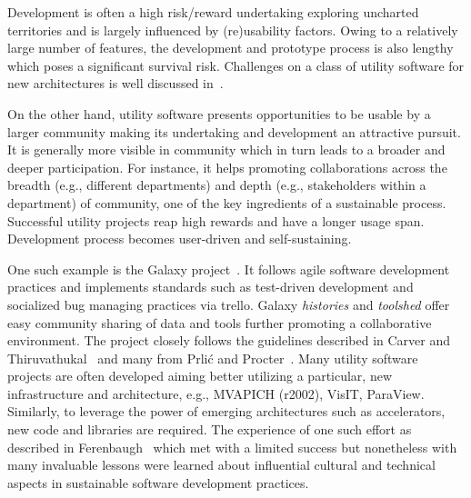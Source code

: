 \documentclass[11pt, oneside]{amsart}
\newcommand{\toolname}[1] {\textsf{#1}}
\begin{document}
Development is often a high risk/reward undertaking exploring
uncharted territories and is largely influenced by (re)usability
factors. Owing to a relatively large number of features, the development
and prototype process is also lengthy which poses a significant
survival risk. Challenges on a class of utility software for new
architectures is well discussed in~\cite{Ferenbaugh_WSSSPE}.

On the other hand, utility software presents opportunities to be usable by a
larger community making its undertaking and development an attractive pursuit.
It is generally more visible in community which in turn leads to a broader and
deeper participation. For instance, it helps promoting collaborations across
the breadth (e.g., different departments) and depth (e.g., stakeholders within
a department) of community, one of the key ingredients of a sustainable
process. Successful utility projects reap high rewards and have a longer usage
span. Development process becomes user-driven and self-sustaining.

One such example is the \toolname{Galaxy} project~\cite{Galaxy}. It follows
agile software development practices and implements standards such as
test-driven development and socialized bug managing practices via
\toolname{trello}. \toolname{Galaxy} \emph{histories} and \emph{toolshed} offer
easy community sharing of data and tools further promoting a collaborative
environment. The project closely follows the guidelines described in Carver and
Thiruvathukal~\cite{Carver_WSSSPE} and many from Prli\'{c} and
Procter~\cite{Prlic_WSSSPE}. Many utility software projects are often developed
aiming better utilizing a particular, new infrastructure and architecture,
e.g., \toolname{MVAPICH (r2002)}, \toolname{VisIT}, \toolname{ParaView}. Similarly, to
leverage the power of emerging architectures such as accelerators, new code and
libraries are required. The experience of one such effort as described in
Ferenbaugh~\cite{Ferenbaugh_WSSSPE} which met with a limited success but
nonetheless with many invaluable lessons were learned about influential
cultural and technical aspects in sustainable software development practices.
\end{document}
